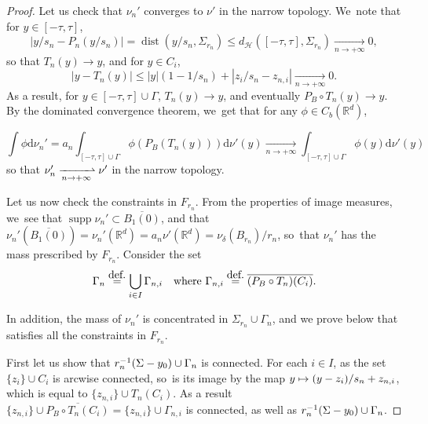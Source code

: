 \documentclass[11pt]{article}
\numberwithin{equation}{section}
\newcommand\mto{\mathchoice{\longmapsto}{\mapsto}{\mapsto}{\mapsto}}
\theoremstyle{definition}
\newcommand{\eqdef}{\ensuremath{\stackrel{\mbox{\upshape\tiny def.}}{=}}}
\newcommand{\RR}{\mathbb{R}}
\DeclareMathOperator{\dist}{dist}
\DeclareMathOperator{\supp}{supp}
\newcommand{\distH}{d_{\mathcal{H}}}
\newcommand\dd{\mathrm{d}}
\newcommand{\abs}[1]{\left\lvert#1\right\rvert}
\begin{document}
\begin{proof}
Let us check that $\nu_n'$ converges to $\nu'$ in the narrow topology. We~note that for $y\in [-\tau,\tau]$,
\[
|y/s_{n} - P_n(y/s_{n})| = \dist\left(y/s_{n}, \Sigma_{r_n}\right) \le \distH\left([-\tau, \tau], \Sigma_{r_n}\right)\xrightarrow[n\to +\infty]{} 0,
\]
so that $T_{n}(y)\to y$, and for $y\in C_{i}$,
\[
\abs{y-T_{n}(y)}\le \abs{y}(1-1/s_{n}) + \abs{z_i/s_n-z_{n,i}}\xrightarrow[n\to +\infty]{} 0.
\]
As a result, for $y\in [-\tau,\tau]\cup \Gamma$, $T_n(y)\to y$, and eventually $P_B\circ T_n(y)\to y$.
By the dominated convergence theorem, we~get that for any $\phi\in C_b(\RR^d)$,

\[
\int\phi\dd \nu_n'
=
a_n\int_{[-\tau,\tau]\cup \Gamma}\phi\left(P_B(T_n(y))\right)\dd \nu'(y)
\xrightarrow[n\to +\infty]{}
\int_{[-\tau,\tau]\cup \Gamma}\phi\left(y\right)\dd \nu'(y)
\]
so that $\nu_n'\xrightharpoonup[n\to +\infty]{}\nu'$ in the narrow topology.

Let us now check the constraints in $F_{r_n}$. From the properties of image measures, we~see that $\supp \nu_n'\subset \overline{B_{1}(0)}$, and that $\nu_n'(\overline{B_{1}(0)})=\nu_n'(\RR^d)=a_n\nu'(\RR^{d})= \nu_{\delta}(B_{r_n})/r_n$, so~that $\nu_n'$ has the mass prescribed by $F_{r_n}$. Consider the set
\begin{equation}\label{eq.defgamman}
\Gamma_n\eqdef
\bigcup_{i\in I} \Gamma_{n,i}
\quad
\mbox{where }
\Gamma_{n,i}\eqdef \overline{(P_B\circ T_{n})(C_{i})}.
\end{equation}

In addition, the mass of $\nu_n'$ is concentrated in $\Sigma_{r_n}\cup \Gamma_n$, and we prove below that satisfies all the constraints in $F_{r_{n}}$.

First let us show that $r_n^{-1}(\Sigma -\nobreak y_0) \cup\nobreak \Gamma_n$ is connected. For each $i\in I$, as the set $\{z_{i}\}\cup C_{i}$ is arcwise connected, so~is its image by the map $y\mto (y-z_{i})/s_n+z_{n,i}$, which is equal to $\{z_{n,i}\}\cup T_n(C_i)$. As a result $\{z_{n,i}\}\cup \overline{P_B\circ T_n(C_i)} = \{z_{n,i}\}\cup \Gamma_{n,i}$ is connected, as well as $r_n^{-1}(\Sigma -\nobreak y_0) \cup\nobreak \Gamma_n$.


\end{proof}
\end{document}
